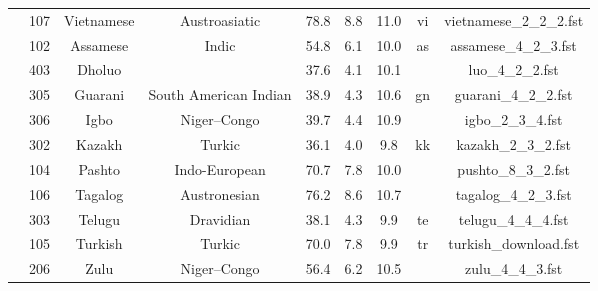 \begin{table}[h!]
\begin{center}
\begin{tabular}{@{}ccccccccc@{}}
                                  & 107                            & Vietnamese                     & Austroasiatic                    & 78.8       & 8.8        & 11.0     & vi         & vietnamese\_2\_2\_2.fst    \\
                                  & 102                            & Assamese                       & Indic                            & 54.8       & 6.1        & 10.0     & as         & assamese\_4\_2\_3.fst      \\
                                  & 403                            & Dholuo                         &                                  & 37.6       & 4.1        & 10.1     &            & luo\_4\_2\_2.fst           \\
                                  & 305                            & Guarani                        & South American Indian            & 38.9       & 4.3        & 10.6     & gn         & guarani\_4\_2\_2.fst       \\
                                  & 306                            & Igbo                           & Niger–Congo                      & 39.7       & 4.4        & 10.9     &            & igbo\_2\_3\_4.fst          \\
                                  & 302                            & Kazakh                         & Turkic                           & 36.1       & 4.0        & 9.8      & kk         & kazakh\_2\_3\_2.fst        \\
                                  & 104                            & Pashto                         & Indo-European                    & 70.7       & 7.8        & 10.0     &            & pushto\_8\_3\_2.fst        \\
                                  & 106                            & Tagalog                        & Austronesian                     & 76.2       & 8.6        & 10.7     &            & tagalog\_4\_2\_3.fst       \\
                                  & 303                            & Telugu                         & Dravidian                        & 38.1       & 4.3        & 9.9      & te         & telugu\_4\_4\_4.fst        \\
                                  & 105                            & Turkish                        & Turkic                           & 70.0       & 7.8        & 9.9      & tr         & turkish\_download.fst      \\
                                  & 206                            & Zulu                           & Niger–Congo                      & 56.4       & 6.2        & 10.5     &            & zulu\_4\_4\_3.fst          \\

\end{tabular}
\end{center}
\end{table}
